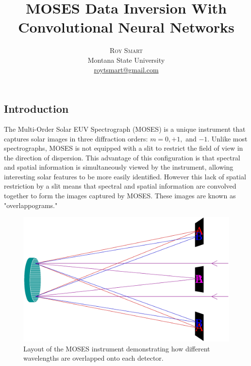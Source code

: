 \documentclass[twoside]{article}
\title{\vspace{-15mm}\fontsize{24pt}{10pt}\selectfont\textbf{MOSES Data Inversion With Convolutional Neural Networks}} %
\author{
\large
\textsc{Roy Smart}\\[2mm] %
\normalsize Montana State University \\ %
\normalsize \href{mailto:roytsmart@gmail.com}{roytsmart@gmail.com} %
\vspace{-5mm}
}
\date{}
\begin{document}
\maketitle %

\thispagestyle{fancy} %




\begin{multicols}{2} %

\section{Introduction}
The Multi-Order Solar EUV Spectrograph (MOSES) is a unique instrument that captures solar images in three diffraction orders: $m=0,+1,$ and $-1$. Unlike most spectrographs, MOSES is not equipped with a slit to restrict the field of view in the direction of dispersion. This advantage of this configuration is that spectral and spatial information is simultaneously viewed by the instrument, allowing interesting solar features to be more easily identified. However this lack of spatial restriction by a slit means that spectral and spatial information are convolved together to form the images captured by MOSES. These images are known as "overlappograms." \par
\begin{figure}[H]
	\includegraphics[width=\linewidth]{images/instrument.eps}
	\caption{Layout of the MOSES instrument demonstrating how different wavelengths are overlapped onto each detector.}

\end{figure}
\end{multicols}
\end{document}
